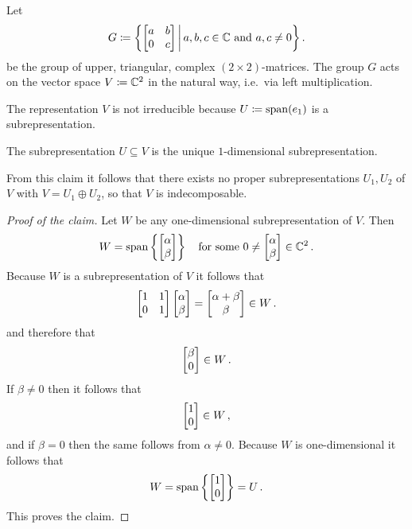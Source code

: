 \begin{example}
  \label{example: upper triangular action on C2}
  Let
  \[
              G
    \coloneqq \left\{
                \begin{bmatrix}
                  a & b \\
                  0 & c
                \end{bmatrix}
              \,\middle|\,
                a, b, c \in \mathbb{C}
                \text{ and }
                a, c \neq 0
              \right\} .
  \]
  be the group of upper, triangular, complex $(2 \times 2)$-matrices.
  The group $G$ acts on the vector space $V \coloneqq \mathbb{C}^2$ in the natural way, i.e.\ via left multiplication.
  
  The representation $V$ is not irreducible because $U \coloneqq \operatorname{span}(e_1)$ is a subrepresentation.
  \begin{claim}
    The subrepresentation $U \subseteq V$ is the unique $1$-dimensional subrepresentation.
  \end{claim}
  From this claim it follows that there exists no proper subrepresentations $U_1, U_2$ of $V$ with $V = U_1 \oplus U_2$, so that $V$ is indecomposable.
  \begin{proof}[Proof of the claim]
    Let $W$ be any one-dimensional subrepresentation of $V$.
    Then
    \[
        W
      = \operatorname{span}\left\{
                \begin{bmatrix}\alpha \\ \beta\end{bmatrix}
              \right\}
      \quad
      \text{for some $0 \neq  \begin{bmatrix}\alpha \\ \beta\end{bmatrix} \in   \mathbb{C}^2$} \,.
    \]
    Because $W$ is a subrepresentation of $V$ it follows that
    \[
          \begin{bmatrix}
            1 & 1 \\
            0 & 1
          \end{bmatrix}
          \begin{bmatrix}\alpha \\ \beta\end{bmatrix}
      =   \begin{bmatrix}\alpha + \beta \\ \beta\end{bmatrix}
      \in W \,.
    \]
    and therefore that
    \[
      \begin{bmatrix}\beta \\ 0\end{bmatrix} \in W \,.
    \]
    If $\beta \neq 0$ then it follows that
    \[
      \begin{bmatrix}1 \\ 0\end{bmatrix} \in W \,,
    \]
    and if $\beta = 0$ then the same follows from $\alpha \neq 0$.
    Because $W$ is one-dimensional it follows that
    \[
        W
      = \operatorname{span} \left\{ \begin{bmatrix}1 \\ 0\end{bmatrix} \right\}
      = U \,.
    \]
    This proves the claim.
  \end{proof}
\end{example}


